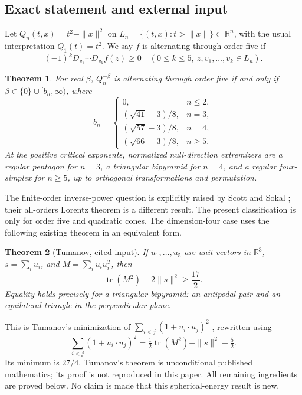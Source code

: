 \documentclass[11pt,a4paper]{article}
\newtheorem{theorem}{Theorem}[section]
\theoremstyle{definition}\newtheorem{definition}[theorem]{Definition}
\theoremstyle{remark}\newtheorem{remark}[theorem]{Remark}
\newcommand{\R}{\mathbb R}\newcommand{\C}{\mathbb C}\newcommand{\N}{\mathbb N}
\DeclareMathOperator{\tr}{tr}\DeclareMathOperator{\supp}{supp}\DeclareMathOperator{\TV}{TV}
\numberwithin{equation}{section}
\begin{document}
\subsection{Exact statement and external input}\label{S09-sec-1}
Let $Q_n(t,x)=t^2-\|x\|^2$ on $L_n=\{(t,x):t>\|x\|\}\subset\R^n$, with the usual interpretation $Q_1(t)=t^2$. We say $f$ is alternating through order five if
\[
 (-1)^kD_{v_1}\cdots D_{v_k}f(z)\ge0
 \quad(0\le k\le5,\ z,v_1,\ldots,v_k\in L_n).
\]
\begin{theorem}\label{S09-main}
For real $\beta$, $Q_n^{-\beta}$ is alternating through order five if and only if $\beta\in\{0\}\cup[b_n,\infty)$, where
\[
 b_n=\begin{cases}
 0,&n\le2,\\
 (\sqrt{41}-3)/8,&n=3,\\
 (\sqrt{57}-3)/8,&n=4,\\
 (\sqrt{66}-3)/8,&n\ge5.
 \end{cases}
\]
At the positive critical exponents, normalized null-direction extremizers are a regular pentagon for $n=3$, a triangular bipyramid for $n=4$, and a regular four-simplex for $n\ge5$, up to orthogonal transformations and permutation.
\end{theorem}
The finite-order inverse-power question is explicitly raised by Scott and Sokal \cite[Section 1.5]{ref005}; their all-orders Lorentz theorem is a different result. The present classification is only for order five and quadratic cones. The dimension-four case uses the following existing theorem in an equivalent form.
\begin{theorem}[Tumanov, cited input]\label{S09-tumanov}
If $u_1,\ldots,u_5$ are unit vectors in $\R^3$, $s=\sum_i u_i$, and $M=\sum_i u_i u_i^T$, then
\begin{equation}\label{S09-tum}
 \tr(M^2)+2\|s\|^2\ge\frac{17}{2}.
\end{equation}
Equality holds precisely for a triangular bipyramid: an antipodal pair and an equilateral triangle in the perpendicular plane.
\end{theorem}
This is Tumanov's minimization of $\sum_{i<j}(1+u_i\cdot u_j)^2$ \cite[Sections 2--6]{ref011}, rewritten using
\[
 \sum_{i<j}(1+u_i\cdot u_j)^2=\tfrac12\tr(M^2)+\|s\|^2+\tfrac52.
\]
Its minimum is $27/4$. Tumanov's theorem is unconditional published mathematics; its proof is not reproduced in this paper. All remaining ingredients are proved below. No claim is made that this spherical-energy result is new.
\end{document}
